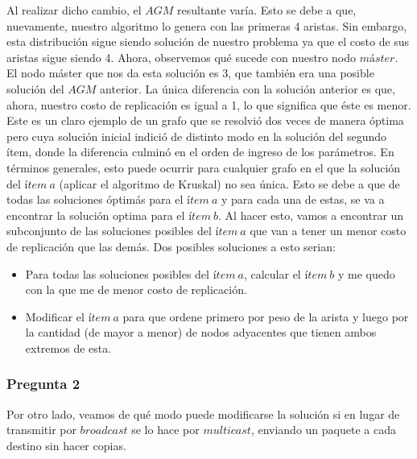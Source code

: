 \newline
Al realizar dicho cambio, el $AGM$ resultante varía. Esto se debe a que, nuevamente, nuestro algoritmo lo genera con las primeras 4 aristas. Sin embargo, esta distribución sigue siendo solución de nuestro problema ya que el costo de sus aristas sigue siendo 4. \newline
Ahora, observemos qué sucede con nuestro nodo $máster$. El nodo máster que nos da esta solución es 3, que también era una posible solución del $AGM$ anterior. La única diferencia con la solución anterior es que, ahora, nuestro costo de replicación es igual a 1, lo que significa que éste es menor. \newline
\newline
Este es un claro ejemplo de un grafo que se resolvió dos veces de manera óptima pero cuya solución inicial indició de distinto modo en la solución del segundo ítem, donde la diferencia culminó en el orden de ingreso de los parámetros.
\newline
\newline
En términos generales, esto puede ocurrir para cualquier grafo en el que la solución del $ítem\ a$ (aplicar el algoritmo de Kruskal) no sea única. Esto se debe a que de todas las soluciones óptimás para el $ítem\ a$ y para cada una de estas, se va a encontrar la solución optima para el $ítem\ b$. Al hacer esto, vamos a encontrar un subconjunto de las soluciones posibles del  $ítem\ a$ que van a tener un menor costo de replicación que las demás.
\newline
\newline
Dos posibles soluciones a esto serian:
\begin{itemize}
\item Para todas las soluciones posibles del  $ítem\ a$, calcular el $ítem\ b$ y me quedo con la que me de menor costo de replicación.
\item Modificar el  $ítem\ a$ para que ordene primero por peso de la arista y luego por la cantidad (de mayor a menor) de nodos adyacentes que tienen ambos extremos de esta. 
\end{itemize}

\subsubsection{Pregunta 2}

 Por otro lado, veamos de qué modo puede modificarse la solución si en lugar de transmitir por $broadcast$ se lo hace por $multicast$, enviando un paquete a cada destino sin hacer copias. \newline


